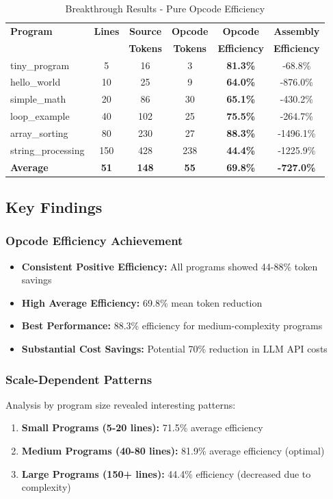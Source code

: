 \documentclass[11pt,a4paper]{article}
\begin{document}
\begin{table}[H]
\centering
\caption{Breakthrough Results - Pure Opcode Efficiency}
\begin{tabular}{lccccc}
\toprule
\textbf{Program} & \textbf{Lines} & \textbf{Source} & \textbf{Opcode} & \textbf{Opcode} & \textbf{Assembly}\\
& & \textbf{Tokens} & \textbf{Tokens} & \textbf{Efficiency} & \textbf{Efficiency}\\
\midrule
tiny\_program & 5 & 16 & 3 & \textbf{81.3\%} & -68.8\%\\
hello\_world & 10 & 25 & 9 & \textbf{64.0\%} & -876.0\%\\
simple\_math & 20 & 86 & 30 & \textbf{65.1\%} & -430.2\%\\
loop\_example & 40 & 102 & 25 & \textbf{75.5\%} & -264.7\%\\
array\_sorting & 80 & 230 & 27 & \textbf{88.3\%} & -1496.1\%\\
string\_processing & 150 & 428 & 238 & \textbf{44.4\%} & -1225.9\%\\
\midrule
\textbf{Average} & \textbf{51} & \textbf{148} & \textbf{55} & \textbf{69.8\%} & \textbf{-727.0\%}\\
\bottomrule
\end{tabular}
\end{table}

\subsection{Key Findings}

\subsubsection{Opcode Efficiency Achievement}
\begin{itemize}
    \item \textbf{Consistent Positive Efficiency:} All programs showed 44-88\% token savings
    \item \textbf{High Average Efficiency:} 69.8\% mean token reduction
    \item \textbf{Best Performance:} 88.3\% efficiency for medium-complexity programs
    \item \textbf{Substantial Cost Savings:} Potential 70\% reduction in LLM API costs
\end{itemize}

\subsubsection{Scale-Dependent Patterns}
Analysis by program size revealed interesting patterns:
\begin{enumerate}
    \item \textbf{Small Programs (5-20 lines):} 71.5\% average efficiency
    \item \textbf{Medium Programs (40-80 lines):} 81.9\% average efficiency (optimal)
    \item \textbf{Large Programs (150+ lines):} 44.4\% efficiency (decreased due to complexity)
\end{enumerate}
\end{document}

